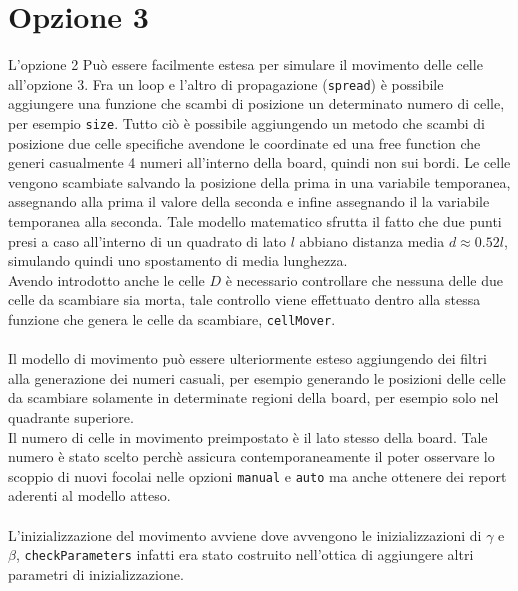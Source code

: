 \documentclass[a4paper]{article}
\begin{document}
\section{Opzione 3}
L'opzione 2 Può essere facilmente estesa per simulare il movimento delle celle all'opzione 3. Fra un loop e l'altro di propagazione (\texttt{spread}) è possibile aggiungere una funzione che scambi di posizione un determinato numero di celle, per esempio \texttt{size}. Tutto ciò è possibile aggiungendo un metodo che scambi di posizione due celle specifiche avendone le coordinate ed una free function che generi casualmente 4 numeri all'interno della board, quindi non sui bordi. Le celle vengono scambiate salvando la posizione della prima in una variabile temporanea, assegnando alla prima il valore della seconda e infine assegnando il la variabile temporanea alla seconda. Tale modello matematico sfrutta il fatto che due punti presi a caso all'interno di un quadrato di lato $l$ abbiano distanza media $d \approx 0.52l$, simulando quindi uno spostamento di media lunghezza.\\
Avendo introdotto anche le celle $D$ è necessario controllare che nessuna delle due celle da scambiare sia morta, tale controllo viene effettuato dentro alla stessa funzione che genera le celle da scambiare, \texttt{cellMover}.\\ \\
Il modello di movimento può essere ulteriormente esteso aggiungendo dei filtri alla generazione dei numeri casuali, per esempio generando le posizioni delle celle da scambiare solamente in determinate regioni della board, per esempio solo nel quadrante superiore.\\
Il numero di celle in movimento preimpostato è il lato stesso della board. Tale numero è stato scelto perchè assicura contemporaneamente il poter osservare lo scoppio di nuovi focolai nelle opzioni \texttt{manual} e \texttt{auto} ma anche ottenere dei report aderenti al modello atteso. \\ \\
L'inizializzazione del movimento avviene dove avvengono le inizializzazioni di $\gamma$ e $\beta$, \texttt{checkParameters} infatti era stato costruito nell'ottica di aggiungere altri parametri di inizializzazione.
\end{document}
